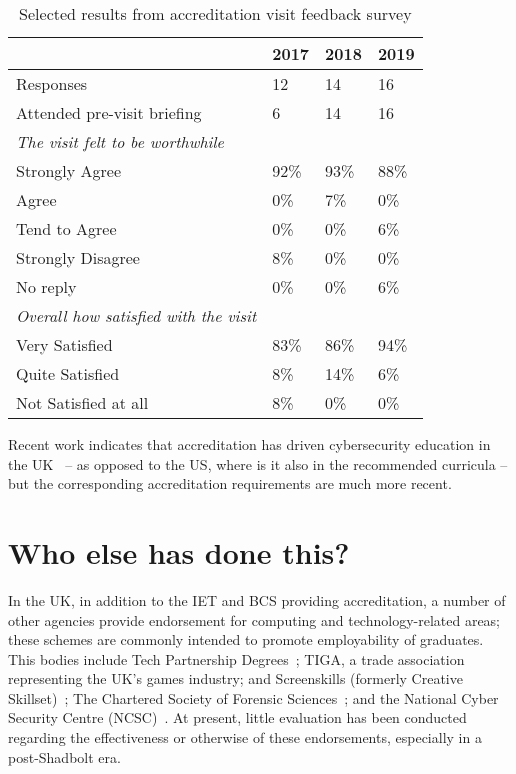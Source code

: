 \documentclass[sigconf]{acmart}
\begin{document}
\begin{table}[h!]
  \caption{Selected results from accreditation visit feedback survey}
  \label{table:1}
\begin{tabular}{ | p{5cm}|p{.75cm}|p{.75cm} |p{.75cm} |}
\hline
 & 2017 & 2018 & 2019   \\ \hline
Responses & 12 & 14 & 16   \\
\hline
Attended pre-visit briefing & 6 & 14 & 16   \\
\hline
{\emph{The visit felt to be worthwhile}} & & &  \\
Strongly Agree &92\% & 93\% &88\% \\
Agree &0\% & 7\% &0\% \\
Tend to Agree &0\% & 0\% &6\% \\
Strongly Disagree &8\% & 0\% &0\% \\
No reply &0\% & 0\% &6\% \\
\hline
{\emph{Overall how satisfied with the visit}} & & &  \\
Very Satisfied &83\% & 86\% &94\% \\
Quite Satisfied &8\% & 14\% &6\% \\
Not Satisfied at all &8\% & 0\% &0\% \\
\hline

\end{tabular}%
\end{table}

Recent work indicates that accreditation has driven cybersecurity
education in the UK~\cite{Cricketal2019} -- as opposed to the US,
where is it also in the recommended curricula -- but the
corresponding accreditation requirements are much more recent.

\section {Who else has done this?}	

In the UK, in addition to the IET and BCS providing accreditation, a
number of other agencies provide endorsement for computing and
technology-related areas; these schemes are commonly intended to
promote employability of graduates. This bodies include Tech
Partnership Degrees~\cite{TP2019}; TIGA, a trade association
representing the UK's games industry; and Screenskills (formerly
Creative Skillset)~\cite{Screenskills2019}; The Chartered Society of
Forensic Sciences~\cite{CSOFS2019}; and the National Cyber Security
Centre (NCSC)~\cite{NCSC2018a}. At present, little evaluation has been
conducted regarding the effectiveness or otherwise of these
endorsements, especially in a post-Shadbolt era.
\end{document}
